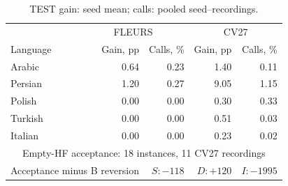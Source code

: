 \begin{table}[t]\centering\footnotesize
\caption{TEST gain: seed mean; calls: pooled seed--recordings.}\label{tab:language}
\setlength{\tabcolsep}{5pt}\renewcommand{\arraystretch}{1.00}
\begin{tabular}{@{}lrrrr@{}}\toprule
 & \multicolumn{2}{c}{FLEURS} & \multicolumn{2}{c}{CV27}\\
Language & Gain, pp & Calls, \% & Gain, pp & Calls, \%\\\midrule
Arabic & 0.64 & 0.23 & 1.40 & 0.11\\
Persian & 1.20 & 0.27 & 9.05 & 1.15\\
Polish & 0.00 & 0.00 & 0.30 & 0.33\\
Turkish & 0.00 & 0.00 & 0.51 & 0.03\\
Italian & 0.00 & 0.00 & 0.23 & 0.02\\
\midrule\multicolumn{5}{c}{Empty-HF acceptance: 18 instances, 11 CV27 recordings}\\
\multicolumn{2}{l}{Acceptance minus B reversion} & $S:-118$ & $D:+120$ & $I:-1995$\\
\bottomrule\end{tabular}\end{table}
